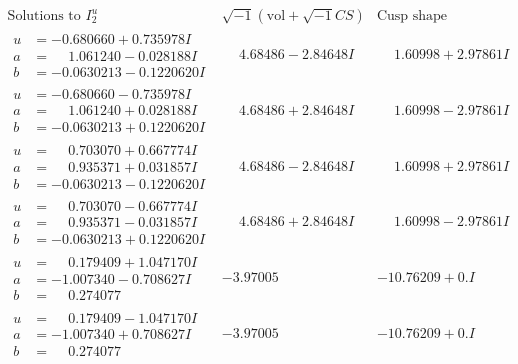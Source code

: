 \documentclass[1p]{elsarticle_modified}
\theoremstyle{definition}
\newcommand{\I}{\sqrt{-1}}
\begin{document}
$$\begin{array}{c|c|c}  
\text{Solutions to }I^u_{2}& \I (\text{vol} + \sqrt{-1}CS) & \text{Cusp shape}\\
 \hline 
\begin{aligned}
u &= -0.680660 + 0.735978 I \\
a &= \phantom{-}1.061240 - 0.028188 I \\
b &= -0.0630213 - 0.1220620 I\end{aligned}
 & \phantom{-}4.68486 - 2.84648 I & \phantom{-}1.60998 + 2.97861 I \\ \hline\begin{aligned}
u &= -0.680660 - 0.735978 I \\
a &= \phantom{-}1.061240 + 0.028188 I \\
b &= -0.0630213 + 0.1220620 I\end{aligned}
 & \phantom{-}4.68486 + 2.84648 I & \phantom{-}1.60998 - 2.97861 I \\ \hline\begin{aligned}
u &= \phantom{-}0.703070 + 0.667774 I \\
a &= \phantom{-}0.935371 + 0.031857 I \\
b &= -0.0630213 - 0.1220620 I\end{aligned}
 & \phantom{-}4.68486 - 2.84648 I & \phantom{-}1.60998 + 2.97861 I \\ \hline\begin{aligned}
u &= \phantom{-}0.703070 - 0.667774 I \\
a &= \phantom{-}0.935371 - 0.031857 I \\
b &= -0.0630213 + 0.1220620 I\end{aligned}
 & \phantom{-}4.68486 + 2.84648 I & \phantom{-}1.60998 - 2.97861 I \\ \hline\begin{aligned}
u &= \phantom{-}0.179409 + 1.047170 I \\
a &= -1.007340 - 0.708627 I \\
b &= \phantom{-}0.274077\phantom{ +0.000000I}\end{aligned}
 & -3.97005\phantom{ +0.000000I} & -10.76209 + 0. I\phantom{ +0.000000I} \\ \hline\begin{aligned}
u &= \phantom{-}0.179409 - 1.047170 I \\
a &= -1.007340 + 0.708627 I \\
b &= \phantom{-}0.274077\phantom{ +0.000000I}\end{aligned}
 & -3.97005\phantom{ +0.000000I} & -10.76209 + 0. I\phantom{ +0.000000I} \\ \hline\begin{aligned}

\end{aligned}
\end{array}$$
\end{document}

